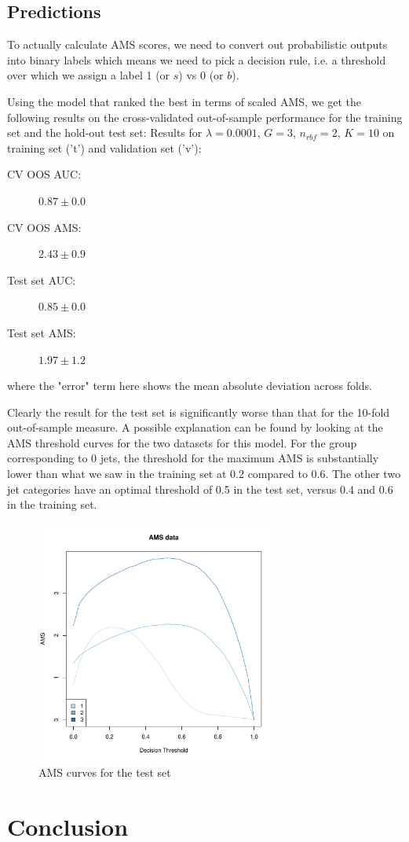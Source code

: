 

\subsection{Predictions}
To actually calculate AMS scores, we need to convert out probabilistic outputs into binary labels which means we need to pick a decision rule, i.e. a threshold over which we assign a label 1 (or $s$) vs 0 (or $b$).

Using the model that ranked the best in terms of scaled AMS, we get the following results on the cross-validated out-of-sample performance for the training set and the hold-out test set:
\newline
Results for $\lambda=0.0001$, $G=3$, $n_{rbf}=2$, $K=10$ on training set ('t') and validation set ('v'):
\begin{description}
    \item[CV OOS AUC:] $0.87 \pm 0.0$
    \item[CV OOS AMS:] $2.43 \pm 0.9$
    \item[Test set AUC:] $0.85 \pm 0.0$
    \item[Test set AMS:] $1.97 \pm 1.2$
\end{description} 
where the "error" term here shows the mean absolute deviation across folds.

Clearly the result for the test set is significantly worse than that for the 10-fold out-of-sample measure. A possible explanation can be found by looking at the AMS threshold curves for the two datasets for this model. For the group corresponding to 0 jets, the threshold for the maximum AMS is substantially lower than what we saw in the training set at 0.2 compared to 0.6. The other two jet categories have an optimal threshold of 0.5 in the test set, versus 0.4 and 0.6 in the training set. 

\begin{figure}[h]
    \includegraphics[width=8cm]{validation-ams-curves.pdf}
    \caption{AMS curves for the test set}
\end{figure}

\section{Conclusion}
\label{conclusion}

\pagebreak 


{}


